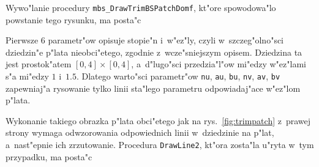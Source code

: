 Wywo"lanie procedury \texttt{mbs\_DrawTrimBSPatchDomf}, kt"ore spowodowa"lo
powstanie tego rysunku, ma posta"c

\vspace{\medskipamount}
\vspace{\medskipamount}

Pierwsze $6$ parametr"ow opisuje stopie"n i~w"ez"ly, czyli w~szczeg"olno"sci
dziedzin"e p"lata nieobci"etego, zgodnie z~wcze"sniejszym opisem.
Dziedzina ta jest prostok"atem $[0,4]\times[0,4]$, a~d"lugo"sci
przedzia"l"ow mi"edzy w"ez"lami s"a mi"edzy $1$ i~$1.5$.
Dlatego warto"sci parametr"ow \texttt{nu}, \texttt{au}, \texttt{bu},
\texttt{nv}, \texttt{av}, \texttt{bv} zapewniaj"a rysowanie tylko linii
sta"lego parametru odpowiadaj"ace w"ez"lom p"lata.

Wykonanie takiego obrazka p"lata obci"etego jak na rys.~\ref{fig:trimpatch}
z~prawej strony wymaga odwzorowania odpowiednich linii w~dziedzinie na
p"lat, a~nast"epnie ich zrzutowanie. Procedura \texttt{DrawLine2}, kt"ora
zosta"la u"ryta w~tym przypadku, ma posta"c

